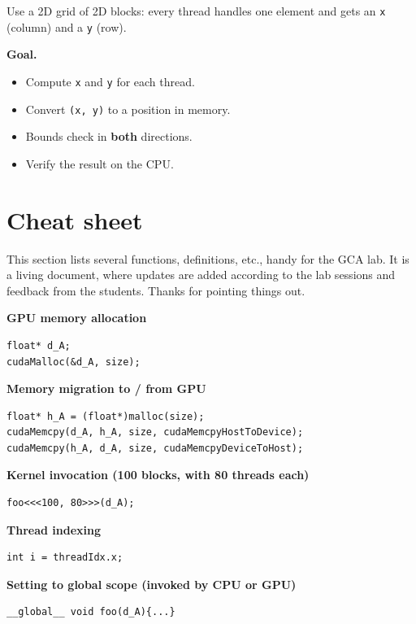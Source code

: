 \documentclass[11pt,a4paper]{article}
\begin{document}
Use a 2D grid of 2D blocks: every thread handles one element and gets an \texttt{x} (column) and a \texttt{y} (row).

\textbf{Goal.}
\begin{itemize}[nosep]
  \item Compute \texttt{x} and \texttt{y} for each thread.
  \item Convert \texttt{(x, y)} to a position in memory.
  \item Bounds check in \textbf{both} directions.
  \item Verify the result on the CPU.
\end{itemize}

\newpage
\section{Cheat sheet}

This section lists several functions, definitions, etc., handy for the GCA lab. It is a living document, where updates are added according to the lab sessions and feedback from the students. Thanks for pointing things out.

\textbf{GPU memory allocation}
\begin{lstlisting}[language=CUDA,numbers=none]
float* d_A;
cudaMalloc(&d_A, size);
\end{lstlisting}

\textbf{Memory migration to / from GPU}
\begin{lstlisting}[language=CUDA,numbers=none]
float* h_A = (float*)malloc(size);
cudaMemcpy(d_A, h_A, size, cudaMemcpyHostToDevice);
cudaMemcpy(h_A, d_A, size, cudaMemcpyDeviceToHost);
\end{lstlisting}

\textbf{Kernel invocation (100 blocks, with 80 threads each)}
\begin{lstlisting}[language=CUDA,numbers=none]
foo<<<100, 80>>>(d_A);
\end{lstlisting}

\textbf{Thread indexing}
\begin{lstlisting}[language=CUDA,numbers=none]
int i = threadIdx.x;
\end{lstlisting}

\textbf{Setting to global scope (invoked by CPU or GPU)}
\begin{lstlisting}[language=CUDA,numbers=none]
__global__ void foo(d_A){...}
\end{lstlisting}
\end{document}
